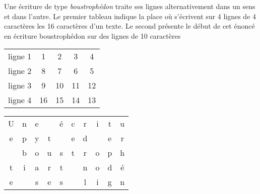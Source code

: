 Une écriture de type \emph{boustrophédon} traite ses lignes alternativement dans un sens et dans l'autre. Le premier tableau indique la place où s'écrivent sur 4 lignes de 4 caractères les 16 caractères d'un texte. Le second présente le début de cet énoncé en écriture boustrophédon sur des lignes de 10 caractères
\begin{center}
\begin{tabular}{l|cccc}
ligne 1 & 1 & 2 & 3 & 4\\
ligne 2 & 8 & 7 & 6 & 5\\
ligne 3 & 9 & 10 & 11 & 12\\
ligne 4 & 16 & 15 & 14 & 13
\end{tabular}
\hfill
\begin{tabular}{cccccccccc}
 U & n & e &   & é & c & r & i & t & u \\
 e & p & y & t &   & e & d &   & e & r \\
   & b & o & u & s & t & r & o & p &  h \\
 t & i & a & r & t &   & n & o & d & é  \\
 e &   & s & e & s &   & l & i & g & n 
 \end{tabular}
\end{center}

